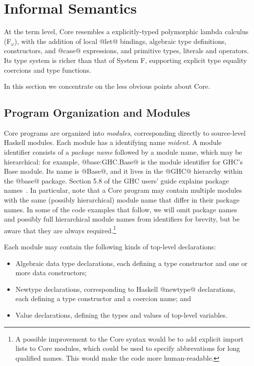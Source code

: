 \documentclass[10pt]{article}
\begin{document}
\section{Informal Semantics}
\label{sec:informal}

At the term level, Core resembles a explicitly-typed polymorphic lambda calculus (F$_\omega$), with the addition
of local @let@ bindings, algebraic type definitions, constructors, and @case@ expressions,
and primitive types, literals and operators. Its type system is richer than that of System F, supporting explicit type equality coercions and type functions.~\citep{system-fc}

In this section we concentrate on the less obvious points about Core.

\subsection{Program Organization and Modules}
\label{sec:modules}

Core programs are organized into {\em modules}, corresponding directly to source-level Haskell modules.
Each module has a identifying name {\it mident}. A module identifier consists of a {\it package name} followed by a module name, which may be hierarchical: for example, @base:GHC.Base@ is the module identifier for GHC's Base module. Its name is @Base@, and it lives in the @GHC@ hierarchy within the @base@ package. Section 5.8 of the GHC users' guide explains package names~\citep{ghc-user-guide}. In particular, note that a Core program may contain multiple modules with the same (possibly hierarchical) module name that differ in their package names. In some of the code examples that follow, we will omit package names and possibly full hierarchical module names from identifiers for brevity, but be aware that they are always required.\footnote{A possible improvement to the Core syntax would be to add explicit import lists to Core modules, which could be used to specify abbrevations for long qualified names. This would make the code more human-readable.}

Each module may contain the following kinds of top-level declarations:
\begin{itemize}
\item Algebraic data type declarations, each defining a type constructor and one or more data constructors;
\item Newtype declarations,  corresponding to Haskell @newtype@ declarations, each defining a type constructor and a coercion name; and
\item Value declarations, defining the types and values of top-level variables.
\end{itemize}
\end{document}
